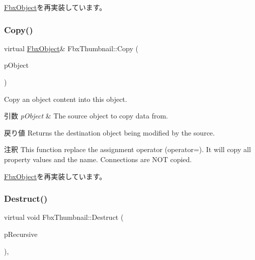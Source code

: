 \hyperlink{class_fbx_object_ad44f814323dc1b5e78bff1bfc608b4bb}{Fbx\+Object}を再実装しています。

\mbox{\label{class_fbx_thumbnail_a6321469006b5ec3769f618ab2d1444d6}} 
\subsubsection{\texorpdfstring{Copy()}{Copy()}}
{\footnotesize\ttfamily virtual \hyperlink{class_fbx_object}{Fbx\+Object}\& Fbx\+Thumbnail\+::\+Copy (\begin{DoxyParamCaption}\item[{const \hyperlink{class_fbx_object}{Fbx\+Object} \&}]{p\+Object }\end{DoxyParamCaption})\hspace{0.3cm}{\ttfamily [virtual]}}

Copy an object content into this object. 
\begin{DoxyParams}{引数}
{\em p\+Object} & The source object to copy data from. \\
\hline
\end{DoxyParams}
\begin{DoxyReturn}{戻り値}
Returns the destination object being modified by the source. 
\end{DoxyReturn}
\begin{DoxyRemark}{注釈}
This function replace the assignment operator (operator=). It will copy all property values and the name. Connections are N\+OT copied. 
\end{DoxyRemark}


\hyperlink{class_fbx_object_a0c0c5adb38284d14bb82c04d54504a3e}{Fbx\+Object}を再実装しています。

\mbox{\label{class_fbx_thumbnail_a3dc89129014f8264fe8e8eb0c6eec711}} 
\subsubsection{\texorpdfstring{Destruct()}{Destruct()}}
{\footnotesize\ttfamily virtual void Fbx\+Thumbnail\+::\+Destruct (\begin{DoxyParamCaption}\item[{bool}]{p\+Recursive }\end{DoxyParamCaption})\hspace{0.3cm}{\ttfamily [protected]}, {\ttfamily [virtual]}}


